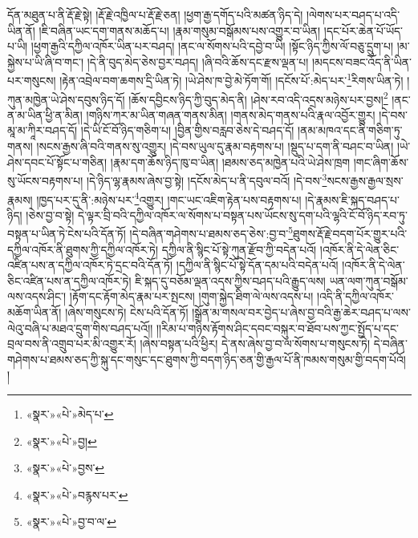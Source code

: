 དོན་མཐུན་པ་ནི་རྡོ་རྗེ་སྟེ། །རྡོ་རྗེ་འཁྱིལ་པ་རྡོ་རྗེ་ཅན། །ཕྱག་རྒྱ་དགོད་པའི་མཚན་ཉིད་དེ། །ལེགས་པར་བཤད་པ་འདི་ཡིན་ནོ། །ཇི་བཞིན་ཡང་དག་གནས་མཆོད་པ། །རྣམ་གསུམ་བསྒོམས་པས་འགྱུར་བ་ཡིན། །དང་པོར་ཆེན་པོ་ཡོད་པ་ཡི། །ཕྱག་རྒྱའི་དཀྱིལ་འཁོར་ཡིན་པར་བཤད། །ནང་ལ་སོགས་པའི་དབྱེ་བ་ཡི། །སྟོང་ཉིད་ཀྱིས་ལོ་བཅུ་དྲུག་པ། །མ་སྐྱེས་པ་ཡི་ཞི་བ་གང་། །དེ་ནི་བུད་མེད་ཅེས་བྱར་བཤད། །ཞི་བའི་ཆོས་དང་རྫས་ལྡན་པ། །མདངས་བཟང་འོད་ནི་ཡིན་པར་གསུངས། །རྟེན་འབྲེལ་བག་ཆགས་དྲི་ཡིན་ཏེ། །ཡེ་ཤེས་ཁ་བྱེ་མེ་ཏོག་གོ། །དངོས་པོ་:མེད་པར་\footnote{«སྣར་»«པེ་»མེད་པ་}རིགས་ཡིན་ཏེ། །ཀུན་མཁྱེན་ཡེ་ཤེས་དབུས་ཉིད་དོ། །ཆོས་དབྱིངས་ཉིད་ཀྱི་བུད་མེད་ནི། །ཤེས་རབ་འདི་འདྲས་མཉེས་པར་བྱས།\footnote{«སྣར་»«པེ་»བྱ།} །ནང་ན་མ་ཡིན་ཕྱི་ན་མིན། །གཉིས་ཀར་མ་ཡིན་གཞན་གནས་མིན། །གནས་མེད་གནས་པའི་རྣལ་འབྱོར་གྱུར། །དེ་བས་མཱ་མ་ཀཱིར་བཤད་དོ། །དེ་ཡི་ངོ་བོ་ཉིད་གཅིག་པ། །བྱིན་གྱིས་བརླབ་ཅེས་དེ་བཤད་དོ། །ནམ་མཁའ་དང་ནི་གཅིག་ཏུ་གནས། །སངས་རྒྱས་ཞི་བའི་གནས་སུ་འགྱུར། །དེ་བས་ཡུལ་དུ་རྣམ་བརྟགས་པ། །སྡུད་པ་དག་ནི་བཤང་བ་ཡིན། །ཡེ་ཤེས་དབང་པོ་སྟོང་པ་གཅིན། །རྣམ་དག་ཆོས་ཉིད་ཁུ་བ་ཡིན། །ཐམས་ཅད་མཁྱེན་པའི་ཡེ་ཤེས་ཁྲག །གང་ཞིག་ཆོས་སུ་ཡོངས་བརྟགས་པ། །དེ་ཉིད་ལྷ་རྣམས་ཞེས་བྱ་སྟེ། །དངོས་མེད་པ་ནི་དབུལ་བའོ། །དེ་བས་\footnote{«སྣར་»«པེ་»བྱས་}སངས་རྒྱས་རྒྱལ་སྲས་རྣམས། །ཁྱད་པར་དུ་ནི་:མཉེས་པར་\footnote{«སྣར་»«པེ་»བརྙས་པར་}འགྱུར། །གང་ཡང་འཇིག་རྟེན་པས་བརྟགས་པ། །དེ་རྣམས་ཇི་སྐད་བཤད་པ་ཉིད། །ཅེས་བྱ་བ་སྟེ། དེ་ལྟར་བྲི་བའི་དཀྱིལ་འཁོར་ལ་སོགས་པ་བསྟན་པས་ཡོངས་སུ་དག་པའི་ལྷའི་ངོ་བོ་ཉིད་རབ་ཏུ་བསྟན་པ་ཡིན་ཏེ་ངེས་པའི་དོན་ཏོ། །དེ་བཞིན་གཤེགས་པ་ཐམས་ཅད་ཅེས་:བྱ་བ་\footnote{«སྣར་»«པེ་»བྱ་བ་ལ་}ཐུགས་རྡོ་རྗེ་བདག་པོར་གྱུར་པའི་དཀྱིལ་འཁོར་ནི་ཐུགས་ཀྱི་དཀྱིལ་འཁོར་ཏེ། དཀྱིལ་ནི་སྙིང་པོ་སྟེ་ཀུན་རྫོབ་ཀྱི་བདེན་པའོ། །འཁོར་ནི་དེ་ལེན་ཅིང་འཛིན་པས་ན་དཀྱིལ་འཁོར་ཏེ་དྲང་བའི་དོན་ཏོ། །དཀྱིལ་ནི་སྙིང་པོ་སྟེ་དོན་དམ་པའི་བདེན་པའོ། །འཁོར་ནི་དེ་ལེན་ཅིང་འཛིན་པས་ན་དཀྱིལ་འཁོར་ཏེ། ཇི་སྐད་དུ་བཅོམ་ལྡན་འདས་ཀྱིས་བཤད་པའི་རྒྱུད་ལས། ཡན་ལག་ཀུན་བསྒོམ་ལས་འདས་ཤིང་། །རྟོག་དང་རྟོག་མེད་རྣམ་པར་སྤངས། །གུག་སྐྱེད་ཐིག་ལེ་ལས་འདས་པ། །འདི་ནི་དཀྱིལ་འཁོར་མཆོག་ཡིན་ནོ། །ཞེས་གསུངས་ཏེ། ངེས་པའི་དོན་ཏོ། །སྒྲོན་མ་གསལ་བར་བྱེད་པ་ཞེས་བྱ་བའི་རྒྱ་ཆེར་བཤད་པ་ལས་ལེའུ་བཞི་པ་མཐའ་དྲུག་གིས་བཤད་པའོ།། །།རིམ་པ་གཉིས་རྟོགས་ཤིང་དབང་བསྐུར་བ་ཐོབ་པས་ཀྱང་སྤྱོད་པ་དང་བྲལ་བས་ནི་འགྲུབ་པར་མི་འགྱུར་རོ། །ཞེས་བསྟན་པའི་ཕྱིར། དེ་ནས་ཞེས་བྱ་བ་ལ་སོགས་པ་གསུངས་ཏེ། དེ་བཞིན་གཤེགས་པ་ཐམས་ཅད་ཀྱི་སྐུ་དང་གསུང་དང་ཐུགས་ཀྱི་བདག་ཉིད་ཅན་གྱི་རྒྱལ་པོ་ནི་ཁམས་གསུམ་གྱི་བདག་པོའོ། །
